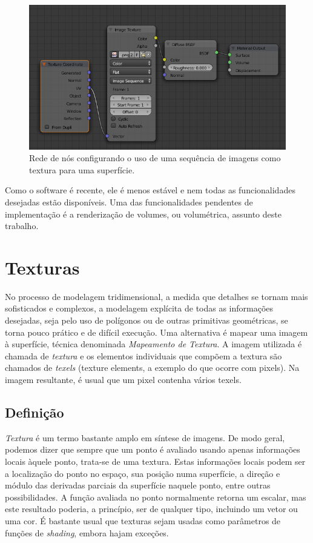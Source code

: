 \documentclass[12pt, a4paper, oneside]{book}
\begin{document}
\begin{figure}[!htb]
\center
\includegraphics[width=15cm]{Cycles_nodes}
\caption{Rede de nós configurando o uso de uma sequência de imagens como textura para uma superfície.}
\label{nodes}
\end{figure}

Como o software é recente, ele é menos estável e nem todas as funcionalidades desejadas estão disponíveis. Uma das funcionalidades pendentes de implementação é a renderização de volumes, ou volumétrica, assunto deste trabalho.

\section{Texturas}
\label{tex_def}

No processo de modelagem tridimensional, a medida que detalhes se tornam mais sofisticados e complexos, a modelagem explícita de todas as informações desejadas, seja pelo uso de polígonos ou de outras primitivas geométricas, se torna pouco prático e de difícil execução. Uma alternativa é mapear uma imagem à superfície, técnica denominada {\it Mapeamento de Textura}. A imagem utilizada é chamada de {\it textura} e os elementos individuais que compõem a textura são chamados de {\it texels} (texture elements, a exemplo do que ocorre com pixels). Na imagem resultante, é usual que um pixel contenha vários texels.

\subsection{Definição}

{\it Textura} é um termo bastante amplo em síntese de imagens. De modo geral, podemos dizer que sempre que um ponto é avaliado usando apenas informações locais àquele ponto, trata-se de uma textura. Estas informações locais podem ser a localização do ponto no espaço, sua posição numa superfície, a direção e módulo das derivadas parciais da superfície naquele ponto, entre outras possibilidades. A função avaliada no ponto normalmente retorna um escalar, mas este resultado poderia, a princípio, ser de qualquer tipo, incluindo um vetor ou uma cor. É bastante usual que texturas sejam usadas como parâmetros de funções de {\it shading}, embora hajam exceções. 
\end{document}
